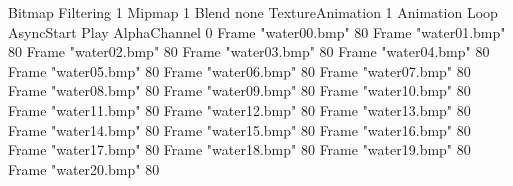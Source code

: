 {Bitmap
	{Filtering 1}
	{Mipmap 1}
	{Blend none}
	{TextureAnimation 1}
	{Animation Loop AsyncStart Play}
	{AlphaChannel 0}
	{Frame "water00.bmp" 80}
	{Frame "water01.bmp" 80}
	{Frame "water02.bmp" 80}
	{Frame "water03.bmp" 80}
	{Frame "water04.bmp" 80}
	{Frame "water05.bmp" 80}
	{Frame "water06.bmp" 80}
	{Frame "water07.bmp" 80}
	{Frame "water08.bmp" 80}
	{Frame "water09.bmp" 80}
	{Frame "water10.bmp" 80}
	{Frame "water11.bmp" 80}
	{Frame "water12.bmp" 80}
	{Frame "water13.bmp" 80}
	{Frame "water14.bmp" 80}
	{Frame "water15.bmp" 80}
	{Frame "water16.bmp" 80}
	{Frame "water17.bmp" 80}
	{Frame "water18.bmp" 80}
	{Frame "water19.bmp" 80}
	{Frame "water20.bmp" 80}
}
